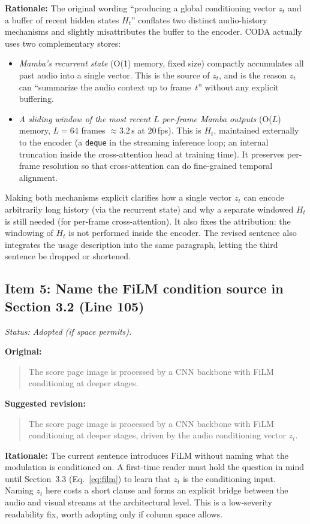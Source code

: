 \documentclass{article}
\begin{document}
\textbf{Rationale:}
The original wording ``producing a global conditioning vector $z_t$ and a buffer of recent hidden states $H_t$'' conflates two distinct audio-history mechanisms and slightly misattributes the buffer to the encoder. CODA actually uses two complementary stores:
\begin{itemize}
    \item \emph{Mamba's recurrent state} (O(1) memory, fixed size) compactly accumulates all past audio into a single vector. This is the source of $z_t$, and is the reason $z_t$ can ``summarize the audio context up to frame~$t$'' without any explicit buffering.
    \item \emph{A sliding window of the most recent $L$ per-frame Mamba outputs} (O($L$) memory, $L = 64$ frames $\approx 3.2$\,s at 20\,fps). This is $H_t$, maintained externally to the encoder (a \texttt{deque} in the streaming inference loop; an internal truncation inside the cross-attention head at training time). It preserves per-frame resolution so that cross-attention can do fine-grained temporal alignment.
\end{itemize}
Making both mechanisms explicit clarifies how a single vector $z_t$ can encode arbitrarily long history (via the recurrent state) and why a separate windowed $H_t$ is still needed (for per-frame cross-attention). It also fixes the attribution: the windowing of $H_t$ is not performed inside the encoder. The revised sentence also integrates the usage description into the same paragraph, letting the third sentence be dropped or shortened.

\subsection*{Item 5: Name the FiLM condition source in Section 3.2 (Line 105)}

\textit{Status: Adopted (if space permits).}

\textbf{Original:}
\begin{quote}
The score page image is processed by a CNN backbone with FiLM conditioning at deeper stages.
\end{quote}

\textbf{Suggested revision:}
\begin{quote}
The score page image is processed by a CNN backbone with FiLM conditioning at deeper stages, driven by the audio conditioning vector $z_t$.
\end{quote}

\textbf{Rationale:}
The current sentence introduces FiLM without naming what the modulation is conditioned on. A first-time reader must hold the question in mind until Section~3.3 (Eq.~\ref{eq:film}) to learn that $z_t$ is the conditioning input. Naming $z_t$ here costs a short clause and forms an explicit bridge between the audio and visual streams at the architectural level. This is a low-severity readability fix, worth adopting only if column space allows.
\end{document}
